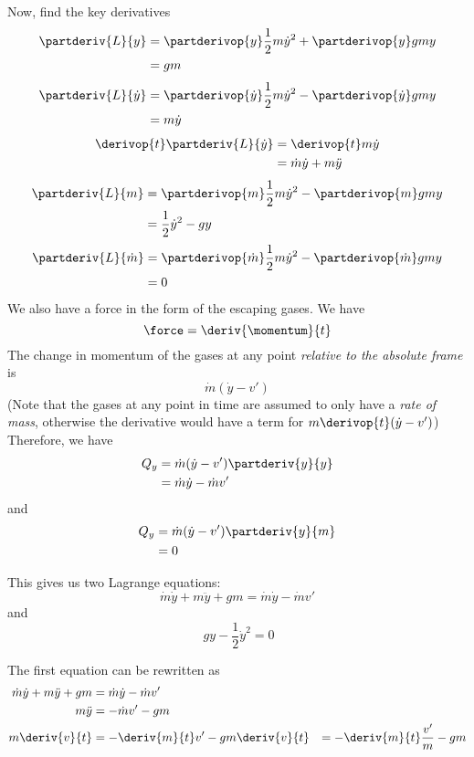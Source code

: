 Now, find the key derivatives
\begin{align*}
  \partderiv{L}{y}
  &=
  \partderivop{y}\frac{1}{2}m\dot{y}^2 + \partderivop{y}gmy \\
  &=
  gm
\end{align*}
\begin{align*}
  \partderiv{L}{\dot{y}}
  &=
  \partderivop{\dot{y}}\frac{1}{2}m\dot{y}^2 - \partderivop{\dot{y}}gmy \\
  &=
  m\dot{y}
\end{align*}
\begin{align*}
  \derivop{t}\partderiv{L}{\dot{y}}
  &=
  \derivop{t}m\dot{y} \\
  &=
  \dot{m}\dot{y} + m\ddot{y}
\end{align*}
\begin{align*}
  \partderiv{L}{m}
  &=
  \partderivop{m}\frac{1}{2}m\dot{y}^2 - \partderivop{m}gmy \\
  &=
  \frac{1}{2}\dot{y}^2 - gy
\end{align*}
\begin{align*}
  \partderiv{L}{\dot{m}}
  &=
  \partderivop{\dot{m}}\frac{1}{2}m\dot{y}^2 - \partderivop{\dot{m}}gmy \\
  &= 0
\end{align*}
We also have a force in the form of the escaping gases.  We have
\[\force = \deriv{\momentum}{t}\]
The change in momentum of the gases at any point \emph{relative to the
  absolute frame} is
\[ \dot{m}(\dot{y} - v') \]
(Note that the gases at any point in time are assumed to only have a
\emph{rate of mass}, otherwise the derivative would have a term for
$m\derivop{t}(\dot{y} - v')$) Therefore, we have
\begin{align*}
  Q_y
  &=
  \dot{m}(\dot{y} - v')\partderiv{y}{y} \\
  &=
  \dot{m}\dot{y} - \dot{m}v'
\end{align*}
and
\begin{align*}
  Q_y
  &=
  \dot{m}(\dot{y} - v')\partderiv{y}{m} \\
  &=
  0
\end{align*}

This gives us two Lagrange equations:
\[ \dot{m}\dot{y} + m\ddot{y} + gm = \dot{m}\dot{y} - \dot{m}v' \]
and
\[\ gy - \frac{1}{2}\dot{y}^2 = 0 \]

The first equation can be rewritten as
\begin{align*}
  \dot{m}\dot{y} + m\ddot{y} + gm &= \dot{m}\dot{y} - \dot{m}v' \\
  m\ddot{y} &= -\dot{m}v' - gm \\
  m\deriv{v}{t} &= -\deriv{m}{t}v' - gm
  \deriv{v}{t} &= -\deriv{m}{t}\frac{v'}{m} - gm
\end{align*}

